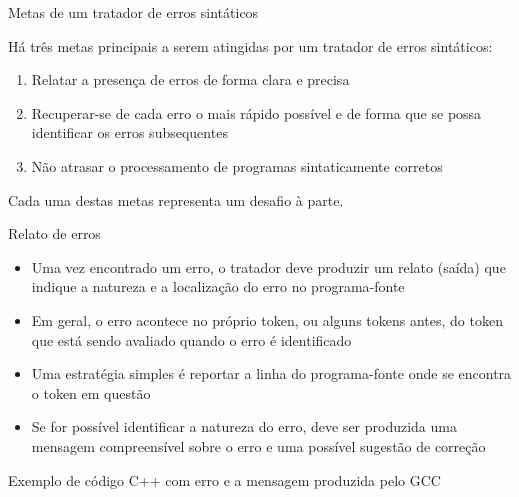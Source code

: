 \begin{frame}[fragile]{Metas de um tratador de erros sintáticos}

    Há três metas principais a serem atingidas por um tratador de erros sintáticos:

    \vspace{0.1in}

    \begin{enumerate}
        \item Relatar a presença de erros de forma clara e precisa

        \item Recuperar-se de cada erro o mais rápido possível e de forma que se possa identificar os erros subsequentes

        \item Não atrasar o processamento de programas sintaticamente corretos
    \end{enumerate}

    \vspace{0.1in}
    Cada uma destas metas representa um desafio à parte.
\end{frame}

\begin{frame}[fragile]{Relato de erros}

    \begin{itemize}
        \item Uma vez encontrado um erro, o tratador deve produzir um relato (saída) que indique a natureza e a localização do erro no programa-fonte

        \item Em geral, o erro acontece no próprio token, ou alguns tokens antes, do token que está sendo avaliado quando o erro é identificado

        \item Uma estratégia simples é reportar a linha do programa-fonte onde se encontra o token em questão

        \item Se for possível identificar a natureza do erro, deve ser produzida uma mensagem compreensível sobre o erro e uma possível sugestão de
            correção
    \end{itemize}

\end{frame}

\begin{frame}[fragile]{Exemplo de código C++ com erro e a mensagem produzida pelo GCC}
    \vspace{0.2in}
\end{frame}

